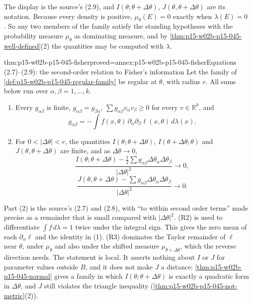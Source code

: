 The display is the source's (2.9), and \(I(\theta;\theta+\Delta\theta)\),
\(J(\theta,\theta+\Delta\theta)\) are its notation. Because every
density is positive, \(\mu_\theta(E)=0\) exactly when \(\lambda(E)=0\).
So any two members of the family satisfy the standing hypotheses with the
probability measure \(\mu_\theta\) as dominating measure, and by
\cref{thm:p15-w02b-p15-045-well-defined}(2) the quantities may be
computed with \(\lambda\).

\begin{hbtheorem}{thm:p15-w02b-p15-045-fisher}{proved=annex:p15-w02b-p15-045-fisher}{Equations (2.7)--(2.9): the second-order relation to Fisher's information}
Let the family of \cref{def:p15-w02b-p15-045-regular-family} be regular
at \(\theta\), with radius \(r\). All sums below run over
\(\alpha,\beta=1,\dots,k\).
\begin{enumerate}
\item Every \(g_{\alpha\beta}\) is finite, \(g_{\alpha\beta}=g_{\beta\alpha}\),
\(\sum g_{\alpha\beta}v_\alpha v_\beta\geq0\) for every \(v\in\mathbb R^k\), and
\[
  g_{\alpha\beta}=-\int f(x,\theta)\,\partial_\alpha\partial_\beta\ell(x,\theta)\,d\lambda(x).
\]
\item For \(0<|\Delta\theta|<r\), the quantities
\(I(\theta;\theta+\Delta\theta)\), \(I(\theta+\Delta\theta;\theta)\) and
\(J(\theta,\theta+\Delta\theta)\) are finite, and as
\(\Delta\theta\to0\),
\[
  \frac{I(\theta;\theta+\Delta\theta)-\tfrac12\sum g_{\alpha\beta}\Delta\theta_\alpha\Delta\theta_\beta}{|\Delta\theta|^2}\to0,
\]
\[
  \frac{J(\theta,\theta+\Delta\theta)-\sum g_{\alpha\beta}\Delta\theta_\alpha\Delta\theta_\beta}{|\Delta\theta|^2}\to0.
\]
\end{enumerate}
\end{hbtheorem}

Part (2) is the source's (2.7) and (2.8), with ``to within second order
terms'' made precise as a remainder that is small compared with
\(|\Delta\theta|^2\). (R2) is used to differentiate
\(\int f\,d\lambda=1\) twice under the integral sign. This gives the
zero mean of each \(\partial_\alpha\ell\) and the identity in (1). (R3)
dominates the Taylor remainder of \(\ell\) near \(\theta\), under
\(\mu_\theta\) and also under the shifted measure
\(\mu_{\theta+\Delta\theta}\), which the reverse direction needs. The
statement is local. It asserts nothing about \(I\) or \(J\) for
parameter values outside \(B\), and it does not make \(J\) a distance:
\cref{thm:p15-w02b-p15-045-normal} gives a family in which
\(I(\theta;\theta+\Delta\theta)\) is exactly a quadratic form in
\(\Delta\theta\), and \(J\) still violates the triangle inequality
(\cref{thm:p15-w02b-p15-045-not-metric}(2)).

